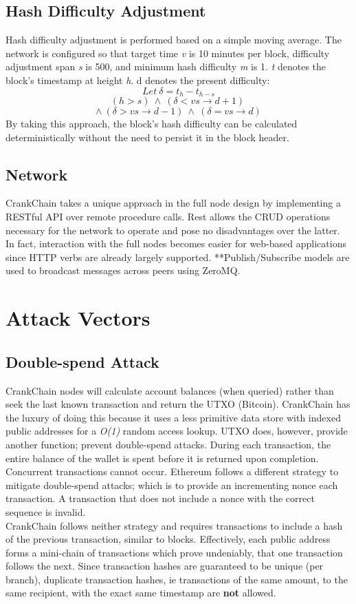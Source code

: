 \documentclass[10pt,twocolumn]{article}
\begin{document}
\subsection{Hash Difficulty Adjustment}
Hash difficulty adjustment is performed based on a simple moving average.  The network is configured so that target time \textit{v} is 10 minutes per block, difficulty adjustment span \textit{s} is 500, and minimum hash difficulty \textit{m} is 1.  \textit{t} denotes the block's timestamp at height \textit{h}. {d} denotes the present difficulty:
\[Let\ \delta = t_h - t_{h-s}\]
\[(h>s)\ \wedge\ (\delta<vs\rightarrow d+1)\ \]\[ \wedge\ (\delta>vs\rightarrow d-1)\ \wedge\ (\delta=vs\rightarrow d)\]
By taking this approach, the block's hash difficulty can be calculated deterministically without the need to persist it in the block header.
\subsection{Network}
CrankChain takes a unique approach in the full node design by implementing a RESTful API over remote procedure calls.  Rest allows the CRUD operations necessary for the network to operate and pose no disadvantages over the latter.  In fact, interaction with the full nodes becomes easier for web-based applications since HTTP verbs are already largely supported.
**Publish/Subscribe models are used to broadcast messages across peers using ZeroMQ.


\section{Attack Vectors}
\subsection{Double-spend Attack}
CrankChain nodes will calculate account balances (when queried) rather than seek the last known transaction and return the UTXO (Bitcoin).  CrankChain has the luxury of doing this because it uses a less primitive data store with indexed public addresses for a \textit{O(1)} random access lookup.  UTXO does, however, provide another function; prevent double-spend attacks.  During each transaction, the entire balance of the wallet is spent before it is returned upon completion.  Concurrent transactions cannot occur.  Ethereum follows a different strategy to mitigate double-spend attacks; which is to provide an incrementing nonce each transaction.  A transaction that does not include a nonce with the correct sequence is invalid.\\
CrankChain follows neither strategy and requires transactions to include a hash of the previous transaction, similar to blocks.  Effectively, each public address forms a mini-chain of transactions which prove undeniably, that one transaction follows the next.  Since transaction hashes are guaranteed to be unique (per branch), duplicate transaction hashes, ie transactions of the same amount, to the same recipient, with the exact same timestamp are \textbf{not} allowed.
\end{document}
